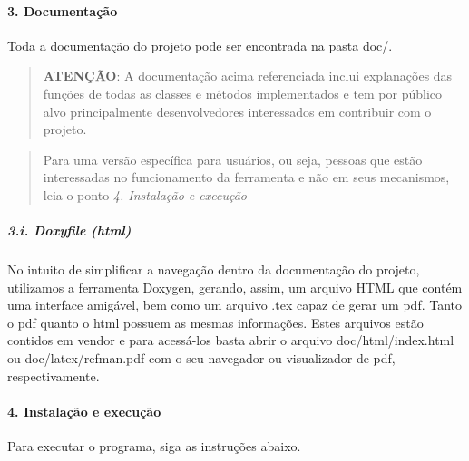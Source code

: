 \paragraph*{3. Documentação}

Toda a documentação do projeto pode ser encontrada na pasta doc/.

\begin{quote}
{\bfseries A\+T\+E\+NÇÃ\+O}\+: A documentação acima referenciada inclui explanações das funções de todas as classes e métodos implementados e tem por público alvo principalmente desenvolvedores interessados em contribuir com o projeto. \end{quote}


\begin{quote}
Para uma versão específica para usuários, ou seja, pessoas que estão interessadas no funcionamento da ferramenta e não em seus mecanismos, leia o ponto {\itshape 4. Instalação e execução} \end{quote}


\subparagraph*{3.\+i. Doxyfile (html)}

No intuito de simplificar a navegação dentro da documentação do projeto, utilizamos a ferramenta Doxygen, gerando, assim, um arquivo H\+T\+M\+L que contém uma interface amigável, bem como um arquivo .tex capaz de gerar um pdf. Tanto o pdf quanto o html possuem as mesmas informações. Estes arquivos estão contidos em vendor e para acessá-\/los basta abrir o arquivo doc/html/index.\+html ou doc/latex/refman.\+pdf com o seu navegador ou visualizador de pdf, respectivamente.

\paragraph*{4. Instalação e execução}

Para executar o programa, siga as instruções abaixo.


